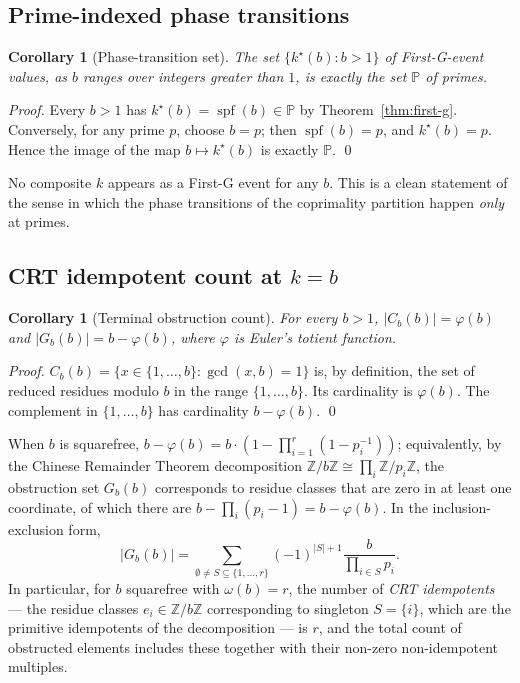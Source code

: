 \documentclass[11pt,reqno]{amsart}
\newtheorem{corollary}[theorem]{Corollary}
\theoremstyle{definition}
\newcommand{\Z}{\mathbb{Z}}
\newcommand{\Prm}{\mathbb{P}}
\DeclareMathOperator{\spf}{spf}
\begin{document}
\subsection{Prime-indexed phase transitions}
\label{ssec:phase}

\begin{corollary}[Phase-transition set]
\label{cor:phase}
The set $\{k^\star(b) : b > 1\}$ of First-G-event values, as $b$ ranges over
integers greater than $1$, is exactly the set $\Prm$ of primes.
\end{corollary}

\begin{proof}
Every $b > 1$ has $k^\star(b) = \spf(b) \in \Prm$ by
Theorem~\ref{thm:first-g}. Conversely, for any prime $p$, choose $b = p$;
then $\spf(b) = p$, and $k^\star(b) = p$. Hence the image of the map
$b \mapsto k^\star(b)$ is exactly $\Prm$.
\qed
\end{proof}

No composite $k$ appears as a First-G event for any $b$. This is a clean
statement of the sense in which the phase transitions of the coprimality
partition happen \emph{only} at primes.

\subsection{CRT idempotent count at $k = b$}
\label{ssec:crt}

\begin{corollary}[Terminal obstruction count]
\label{cor:crt}
For every $b > 1$, $|C_b(b)| = \varphi(b)$ and $|G_b(b)| = b - \varphi(b)$,
where $\varphi$ is Euler's totient function.
\end{corollary}

\begin{proof}
$C_b(b) = \{x \in \{1,\ldots,b\} : \gcd(x,b) = 1\}$ is, by definition, the
set of reduced residues modulo $b$ in the range $\{1,\ldots,b\}$. Its
cardinality is $\varphi(b)$. The complement in $\{1,\ldots,b\}$ has
cardinality $b - \varphi(b)$.
\qed
\end{proof}

When $b$ is squarefree, $b - \varphi(b) = b \cdot (1 - \prod_{i=1}^r (1 -
p_i^{-1}))$; equivalently, by the Chinese Remainder Theorem decomposition
$\Z/b\Z \cong \prod_i \Z/p_i\Z$, the obstruction set $G_b(b)$ corresponds to
residue classes that are zero in at least one coordinate, of which there are
$b - \prod_i (p_i - 1) = b - \varphi(b)$. In the inclusion-exclusion form,
\[
  |G_b(b)| = \sum_{\emptyset \ne S \subseteq \{1,\ldots,r\}}
    (-1)^{|S|+1} \frac{b}{\prod_{i \in S} p_i}.
\]
In particular, for $b$ squarefree with $\omega(b) = r$, the number of
\emph{CRT idempotents} --- the residue classes
$e_i \in \Z/b\Z$ corresponding to singleton $S = \{i\}$, which are the
primitive idempotents of the decomposition --- is $r$, and the total count of
obstructed elements includes these together with their non-zero
non-idempotent multiples.
\end{document}
